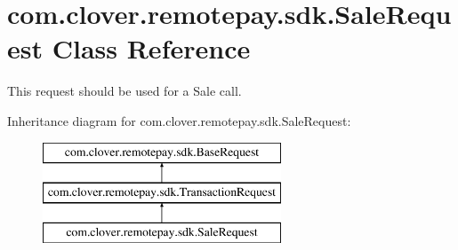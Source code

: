 \hypertarget{classcom_1_1clover_1_1remotepay_1_1sdk_1_1_sale_request}{}\section{com.\+clover.\+remotepay.\+sdk.\+Sale\+Request Class Reference}
\label{classcom_1_1clover_1_1remotepay_1_1sdk_1_1_sale_request}


This request should be used for a Sale call.  


Inheritance diagram for com.\+clover.\+remotepay.\+sdk.\+Sale\+Request\+:\begin{figure}[H]
\begin{center}
\leavevmode
\includegraphics[height=3.000000cm]{classcom_1_1clover_1_1remotepay_1_1sdk_1_1_sale_request}
\end{center}
\end{figure}
